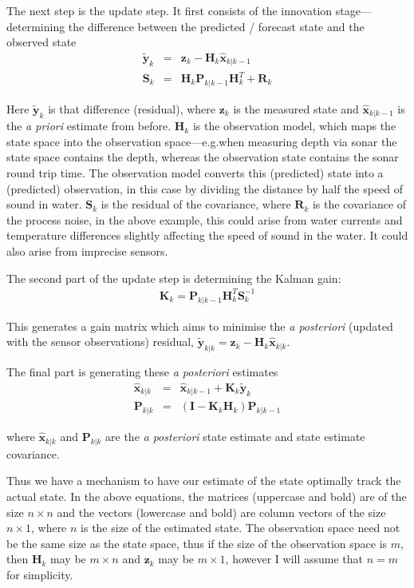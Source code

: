 \documentclass[12pt]{article}
\begin{document}
The next step is the update step. It first consists of the innovation stage---determining the difference between the predicted / forecast state and the observed state
\begin{eqnarray}
	\mathbf{\tilde{y}}_k &=& \mathbf{z}_k - \mathbf{H}_k \mathbf{\hat{x}}_{k|k-1} \\
	\mathbf{S}_k &=& \mathbf{H}_k \mathbf{P}_{k|k-1} \mathbf{H}^T_k + \mathbf{R}_k
\end{eqnarray}

Here $\mathbf{\tilde{y}}_k$ is that difference (residual), where $\mathbf{z}_k$ is the measured state and $\mathbf{\hat{x}}_{k|k-1}$ is the \emph{a priori} estimate from before. $\mathbf{H}_k$ is the observation model, which maps the state space into the observation space---e.g.\@ when measuring depth via sonar the state space contains the depth, whereas the observation state contains the sonar round trip time. The observation model converts this (predicted) state into a (predicted) observation, in this case by dividing the distance by half the speed of sound in water. $\mathbf{S}_k$ is the residual of the covariance, where $\mathbf{R}_k$ is the covariance of the process noise, in the above example, this could arise from water currents and temperature differences slightly affecting the speed of sound in the water. It could also arise from imprecise sensors.

The second part of the update step is determining the Kalman gain:
\begin{eqnarray}
	\mathbf{K}_k = \mathbf{P}_{k|k-1} \mathbf{H}^T_k \mathbf{S}^{-1}_k
\end{eqnarray}

\noindent This generates a gain matrix which aims to minimise the \emph{a posteriori} (updated with the sensor observations) residual, $\mathbf{\tilde{y}}_{k|k} = \mathbf{z}_k - \mathbf{H}_k \mathbf{\hat{x}}_{k|k}$.

The final part is generating these \emph{a posteriori} estimates
\begin{eqnarray}
	\mathbf{\hat{x}}_{k|k} &=& \mathbf{\hat{x}}_{k|k-1} + \mathbf{K}_k \mathbf{\tilde{y}}_k \\
	\mathbf{P}_{k|k} &=& (\mathbf{I} - \mathbf{K}_k \mathbf{H}_k)\mathbf{P}_{k|k-1}
\end{eqnarray}

\noindent where $\mathbf{\hat{x}}_{k|k}$ and $\mathbf{P}_{k|k}$ are the \emph{a posteriori} state estimate and state estimate covariance.

Thus we have a mechanism to have our estimate of the state optimally track the actual state. In the above equations, the matrices (uppercase and bold) are of the size $n \times n$ and the vectors (lowercase and bold) are column vectors of the size $n \times 1$, where $n$ is the size of the estimated state. The observation space need not be the same size as the state space, thus if the size of the observation space is $m$, then $\mathbf{H}_k$ may be $m \times n$ and $\mathbf{z}_k$ may be $m \times 1$, however I will assume that $n = m$ for simplicity.
\end{document}
